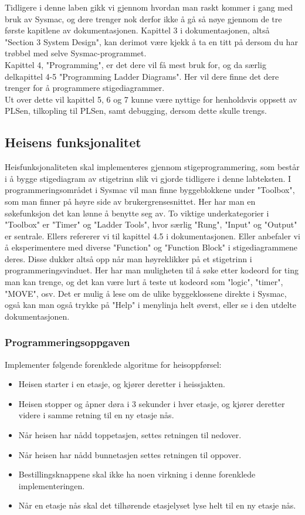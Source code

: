 Tidligere i denne laben gikk vi gjennom hvordan man raskt kommer i gang med bruk av Sysmac, og dere trenger nok derfor ikke å gå så nøye gjennom de tre første kapitlene av dokumentasjonen. Kapittel 3 i dokumentasjonen, altså "Section 3 System Design", kan derimot være kjekk å ta en titt på dersom du har trøbbel med selve Sysmac-programmet.\\

Kapittel 4, "Programming", er det dere vil få mest bruk for, og da særlig delkapittel 4-5 "Programming Ladder Diagrams". Her vil dere finne det dere trenger for å programmere stigediagrammer.\\

Ut over dette vil kapittel 5, 6 og 7 kunne være nyttige for henholdsvis oppsett av PLSen, tilkopling til PLSen, samt debugging, dersom dette skulle trengs.\\

\subsection{Heisens funksjonalitet}
Heisfunksjonaliteten skal implementeres gjennom stigeprogrammering, som består i å bygge stigediagram av stigetrinn slik vi gjorde tidligere i denne labteksten. I programmeringsområdet i Sysmac vil man finne byggeblokkene under "Toolbox", som man finner på høyre side av brukergrensesnittet. Her har man en søkefunksjon det kan lønne å benytte seg av. To viktige underkategorier i "Toolbox" er "Timer" og "Ladder Tools", hvor særlig "Rung", "Input" og "Output" er sentrale. Ellers refererer vi til kapittel 4.5 i dokumentasjonen. Eller anbefaler vi å eksperimentere med diverse "Function" og "Function Block" i stigediagrammene deres. Disse dukker altså opp når man høyreklikker på et stigetrinn i programmeringsvinduet. Her har man muligheten til å søke etter kodeord for ting man kan trenge, og det kan være lurt å teste ut kodeord som "logic", "timer", "MOVE", osv. Det er mulig å lese om de ulike byggeklossene direkte i Sysmac, også kan man også trykke på "Help" i menylinja helt øverst, eller se i den utdelte dokumentasjonen.

\subsubsection{Programmeringsoppgaven}
Implementer følgende forenklede algoritme for heisoppførsel:

\begin{itemize}
    \item Heisen starter i en etasje, og kjører deretter i heissjakten.
    \item Heisen stopper og åpner døra i 3 sekunder i hver etasje, og kjører deretter videre i samme retning til en ny etasje nås.
    \item Når heisen har nådd toppetasjen, settes retningen til nedover. 
    \item Når heisen har nådd bunnetasjen settes retningen til oppover. 
    \item Bestillingsknappene skal ikke ha noen virkning i denne forenklede implementeringen.
    \item Når en etasje nås skal det tilhørende etasjelyset lyse helt til en ny etasje nås.
\end{itemize}